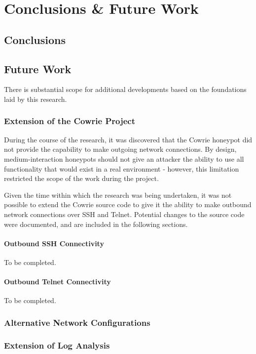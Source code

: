 \chapter{Conclusions \& Future Work}

\section{Conclusions}

\section{Future Work}

There is substantial scope for additional developments based on the foundations laid by this research.

\subsection{Extension of the Cowrie Project}

During the course of the research, it was discovered that the Cowrie honeypot did not provide the capability to make outgoing network connections. By design, medium-interaction honeypots should not give an attacker the ability to use all functionality that would exist in a real environment - however, this limitation restricted the scope of the work during the project.

Given the time within which the research was being undertaken, it was not possible to extend the Cowrie source code to give it the ability to make outbound network connections over SSH and Telnet. Potential changes to the source code were documented, and are included in the following sections.

\subsubsection{Outbound SSH Connectivity}
To be completed.

\subsubsection{Outbound Telnet Connectivity}
To be completed.

\subsection{Alternative Network Configurations}

\subsection{Extension of Log Analysis}
